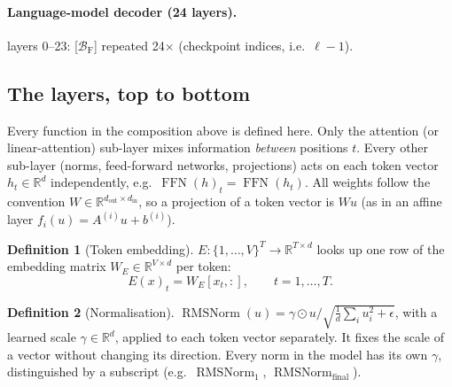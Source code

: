 \documentclass[10pt,a4paper]{article}
\newcommand{\op}[1]{\operatorname{#1}}
\theoremstyle{definition}
\newtheorem{definition}{Definition}[section]
\begin{document}
\paragraph{Language-model decoder (24 layers).} 
layers 0--23: [$\mathcal{B}_{\mathrm{F}}$] repeated 24$\times$ (checkpoint indices, i.e.\ $\ell-1$).
\subsection{The layers, top to bottom}\label{sec:layers}
Every function in the composition above is defined here. Only the attention (or linear-attention) sub-layer mixes information \emph{between} positions $t$. Every other sub-layer (norms, feed-forward networks, projections) acts on each token vector $h_t\in\mathbb{R}^{d}$ independently, e.g.\ $\op{FFN}(h)_t=\op{FFN}(h_t)$. All weights follow the convention $W\in\mathbb{R}^{d_{\mathrm{out}}\times d_{\mathrm{in}}}$, so a projection of a token vector is $W u$ (as in an affine layer $f_i(u)=A^{(i)}u+b^{(i)}$).
\begin{definition}[Token embedding]\label{def:embed}
$E:\{1,\dots,V\}^{T}\to\mathbb{R}^{T\times d}$ looks up one row of the embedding matrix $W_E\in\mathbb{R}^{V\times d}$ per token:
\begin{equation}
  E(x)_t = W_E[x_t,:],\qquad t=1,\dots,T.
\end{equation}
\end{definition}
\begin{definition}[Normalisation]
$\op{RMSNorm}(u)=\gamma\odot u/\sqrt{\tfrac1d\sum_i u_i^2+\epsilon}$, with a learned scale $\gamma\in\mathbb{R}^{d}$, applied to each token vector separately. It fixes the scale of a vector without changing its direction. Every norm in the model has its own $\gamma$, distinguished by a subscript (e.g.\ $\op{RMSNorm}_1$, $\op{RMSNorm}_{\mathrm{final}}$).
\end{definition}
\end{document}
